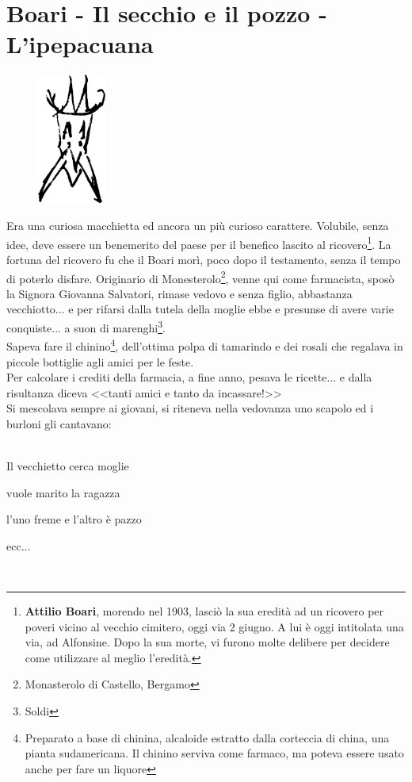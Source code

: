 
\chapter{Boari - Il secchio e il pozzo - L'ipepacuana}
\begin{figure}
  \vspace{-1.2cm}
  \begin{center}
    \includegraphics[width=0.2\textwidth]{Boari}
  \end{center}
  \vspace{-0.5cm}
\end{figure}
Era una curiosa macchietta ed ancora un più curioso carattere. Volubile, senza idee, deve essere un benemerito del paese per il benefico lascito al ricovero\footnote{\textbf{Attilio Boari}, morendo nel 1903, lasciò la sua eredità ad un ricovero per poveri vicino al vecchio cimitero, oggi via 2 giugno. A lui è oggi intitolata una via, ad Alfonsine. Dopo la sua morte, vi furono molte delibere per decidere come utilizzare al meglio l'eredità. }. La fortuna del ricovero fu che il Boari morì, poco dopo il testamento, senza il tempo di poterlo disfare. Originario di Monesterolo\footnote{Monasterolo di Castello, Bergamo}, venne qui come farmacista, sposò la Signora Giovanna Salvatori, rimase vedovo e senza figlio, abbastanza vecchiotto... e per rifarsi dalla tutela della moglie ebbe e presunse di avere varie conquiste... a suon di marenghi\footnote{Soldi}.\\
\indent Sapeva fare il chinino\footnote{Preparato a base di chinina, alcaloide estratto dalla corteccia di china, una pianta sudamericana. Il chinino serviva come farmaco, ma poteva essere usato anche per fare un liquore}, dell'ottima polpa di tamarindo e dei rosali che regalava in piccole bottiglie agli amici per le feste.\\
\indent Per calcolare i crediti della farmacia, a fine anno, pesava le ricette... e dalla risultanza diceva <<tanti amici e tanto da incassare!>>\\
\indent Si mescolava sempre ai giovani, si riteneva nella vedovanza uno scapolo ed i burloni gli cantavano:\\\\
\textcal \Huge
	\centerline{Il vecchietto cerca moglie}
	\centerline{vuole marito la ragazza}
	\centerline{l'uno freme e l'altro è pazzo}
	\centerline{ecc...}
\normalfont \normalsize\\

